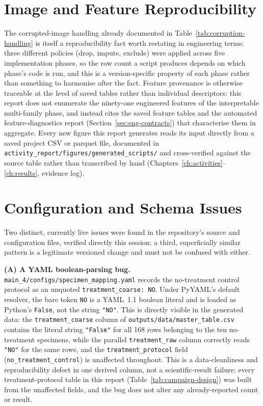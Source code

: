 \section{Image and Feature Reproducibility}
\label{sec:eng-features}

The corrupted-image handling already documented in
Table~\ref{tab:corruption-handling} is itself a reproducibility fact worth
restating in engineering terms: three different policies (drop, impute,
exclude) were applied across five implementation phases, so the row count
a script produces depends on which phase's code is run, and this is a
version-specific property of each phase rather than something to
harmonise after the fact. Feature provenance is otherwise traceable at the
level of saved tables rather than individual descriptors: this report does
not enumerate the ninety-one engineered features of the interpretable
multi-family phase, and instead cites the saved feature tables and the
automated feature-diagnostics report (Section~\ref{sec:eng-contracts})
that characterise them in aggregate. Every new figure this report
generates reads its input directly from a saved project CSV or parquet
file, documented in \texttt{activity\_report/figures/generated\_scripts/}
and cross-verified against the source table rather than transcribed by
hand (Chapters~\ref{ch:activities}--\ref{ch:results}, evidence log).

\section{Configuration and Schema Issues}
\label{sec:eng-schema}

Two distinct, currently live issues were found in the repository's source
and configuration files, verified directly this session; a third,
superficially similar pattern is a legitimate versioned change and must
not be confused with either.

\textbf{(A) A YAML boolean-parsing bug.}
\texttt{main\_4/configs/specimen\_mapping.yaml} records the no-treatment
control protocol as an unquoted \texttt{treatment\_coarse: NO}. Under
PyYAML's default resolver, the bare token \texttt{NO} is a YAML~1.1
boolean literal and is loaded as Python's \texttt{False}, not the string
\texttt{"NO"}. This is directly visible in the generated data: the
\texttt{treatment\_coarse} column of \texttt{outputs/data/master\_table.csv}
contains the literal string \texttt{"False"} for all 168 rows belonging to
the ten no-treatment specimens, while the parallel \texttt{treatment\_raw}
column correctly reads \texttt{"NO"} for the same rows, and the
\texttt{treatment\_protocol} field (\texttt{no\_treatment\_control}) is
unaffected throughout. This is a data-cleanliness and reproducibility
defect in one derived column, not a scientific-result failure: every
treatment-protocol table in this report (Table~\ref{tab:campaign-design})
was built from the unaffected fields, and the bug does not alter any
already-reported count or result.

